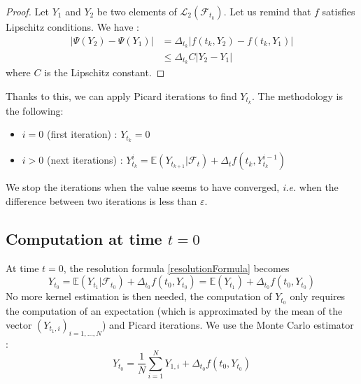 \documentclass[a4paper,11pt,english]{book}
\begin{document}
\begin{proof}
Let $Y_{1}$ and $Y_{2}$ be two elements of $\mathcal{L}_{2}(\mathcal{F}_{t_{k}})$. Let us remind that $f$ satisfies Lipschitz conditions. We have : $$\begin{aligned}
|\Psi(Y_{2})-\Psi(Y_{1})|&=\Delta_{t_{k}}|f(t_{k},Y_{2})-f(t_{k},Y_{1})|\\
&\leq \Delta_{t_{k}} C|Y_{2}-Y_{1}|
\end{aligned}$$
where $C$ is the Lipschitz constant.
\end{proof}
Thanks to this, we can apply Picard iterations to find $Y_{t_{k}}$. The methodology is the following:
\begin{itemize}
    \item $i=0$ (first iteration) : $Y_{t_{k}}=0$
    \item $i>0$ (next iterations) : $Y_{t_{k}}^{i}=\mathbb{E}(Y_{t_{k+1}}|\mathcal{F}_{t}) + \Delta_{t}f(t_{k},Y_{t_{k}}^{i-1})$
\end{itemize}
We stop the iterations when the value seems to have converged, \textit{i.e.} when the difference between two iterations is less than $\varepsilon$.
\subsection{Computation at time $t=0$}
\label{subsec:computation-0}
At time $t=0$, the resolution formula \eqref{resolutionFormula} becomes $$Y_{t_{0}} = \mathbb{E}(Y_{t_{1}}|\mathcal{F}_{t_{0}}) + \Delta_{t_{0}}f(t_{0},Y_{t_{0}})=\mathbb{E}(Y_{t_{1}}) + \Delta_{t_{0}}f(t_{0},Y_{t_{0}})$$
No more kernel estimation is then needed, the computation of $Y_{t_{0}}$ only requires the computation of an expectation (which is approximated by the mean of the vector $(Y_{t_1,i})_{i=1,\ldots,N}$) and Picard iterations. We use the Monte Carlo estimator :
$$Y_{t_{0}} = \frac{1}{N}\sum_{i=1}^{N}Y_{1,i}+\Delta_{t_{0}}f(t_0,Y_{t_{0}})$$
\end{document}
